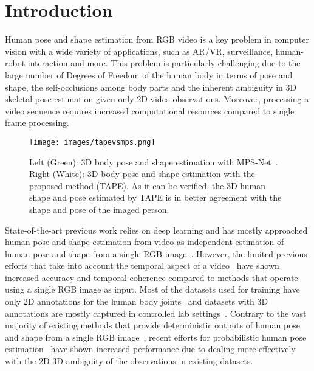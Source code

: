 \documentclass[runningheads]{llncs}
\begin{document}
\section{Introduction}
\label{sec:intro}
Human pose and shape estimation from RGB video is a key problem in computer vision with a wide variety of applications, such as AR/VR, surveillance, human-robot interaction and more. This problem is particularly challenging due to the large number of Degrees of Freedom of the human body in terms of pose and shape, the self-occlusions among body parts and the inherent ambiguity in 3D skeletal pose estimation given only 2D video observations.
Moreover, processing a video sequence requires increased computational resources compared to single frame processing.  
\begin{figure}[t]
    \centering
    \texttt{[image: images/tapevsmps.png]}
    \caption{Left (Green): 3D body pose and shape estimation with MPS-Net~\cite{WeiLin2022mpsnet}. Right (White): 3D body pose and shape estimation with the proposed method (TAPE). As it can be verified, the 3D human shape  and pose estimated by TAPE is in better agreement with the shape and pose of the imaged person. }
    \label{mps-TAPE}
\end{figure}

State-of-the-art previous work relies on deep learning and has mostly approached human pose and shape estimation from video as independent estimation of human pose and shape from a single RGB image~\cite{kolotouros2019spin,kolotouros2019cmr,kanazawaHMR18,Bogo:ECCV:2016,omran2018neural}. However, the limited previous efforts that take into account the temporal aspect of a video~\cite{choi2020beyond,kocabas2019vibe,humanMotionKanazawa19} have shown increased accuracy and temporal coherence compared to methods that operate using a single RGB image as input.
Most of the datasets used for training have only 2D annotations for the human body joints~\cite{6751390,humanMotionKZFM19} and datasets with 3D annotations are mostly captured in controlled lab settings~\cite{h36m_pami}.
Contrary to the vast majority of existing methods that provide deterministic outputs of human pose and shape from a single RGB image~\cite{kolotouros2019spin,kolotouros2019cmr,kanazawaHMR18,Bogo:ECCV:2016}, recent efforts for probabilistic human pose estimation~\cite{kolotouros2021prohmr} have shown increased performance due to dealing more effectively with the 2D-3D ambiguity of the observations in existing datasets.      
\end{document}
